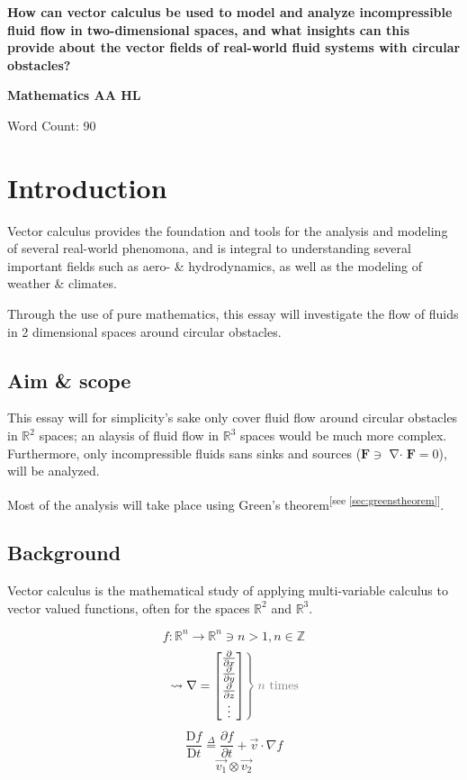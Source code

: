\documentclass[a4paper, 12pt]{article} %
\newcommand{\researchquestion}{How can vector calculus be used to model and analyze incompressible fluid flow in two-dimensional spaces, and what insights can this provide about the vector fields of real-world fluid systems with circular obstacles?}
\newcommand{\fatf}{\mathbf{F}} %
\newcommand{\definedas}{\stackrel{\Delta}{=}} %
\newcommand{\referto}[1]{\textsuperscript{\color{darkgray}\tiny[see \ref{#1}]}} %
\newcommand{\partialder}[2]{\frac{\partial #1}{\partial #2}} %
\newcommand{\materialder}[2]{\frac{\mathrm{D} #1}{\mathrm{D} #2}} %
\DeclareMathOperator{\divergence}{\nabla\cdot} %
\begin{document}
\begin{titlepage} %
	\begin{center}
		\vspace*{0.5cm}
		\Large
		\textbf{\researchquestion}

		\vspace{1.5cm}
		\large
		\textbf{Mathematics AA HL}

		\vfill{}\color{darkgray}
		Word Count: 90 %
	\end{center}
\end{titlepage}

\tableofcontents\newpage %

\section{Introduction}
Vector calculus provides the foundation and tools for the analysis and modeling of several real-world phenomona, and is integral to understanding several important fields such as aero- \& hydrodynamics, as well as the modeling of weather \& climates. 

Through the use of pure mathematics, this essay will investigate the flow of fluids in 2 dimensional spaces around circular obstacles.
\subsection{Aim \& scope}
This essay will for simplicity's sake only cover fluid flow around circular obstacles in $\mathbb{R}^2$ spaces; an alaysis of fluid flow in $\mathbb{R}^3$ spaces would be much more complex.
Furthermore, only incompressible fluids sans sinks and sources ($\fatf\ni\divergence\fatf=0$), will be analyzed.

Most of the analysis will take place using Green's theorem\referto{sec:greenstheorem}.

\subsection{Background}
Vector calculus is the mathematical study of applying multi-variable calculus to vector valued functions, often for the spaces $\mathbb{R}^2$ and $\mathbb{R}^3$.

$$f:\mathbb{R}^n\rightarrow\mathbb{R}^n\ni n>1,n\in\mathbb{Z}$$
\begin{equation}
	\left.\leadsto\nabla=
	\left[\begin{matrix}
		\partialder{}{x} \\
		\partialder{}{y} \\
		\partialder{}{z} \\ 
		\vdots 	         \\
	\end{matrix}\right]
	\color{gray}\right\} \color{gray}n\text{ times}\color{black}
\end{equation}
\begin{equation}
	\materialder{f}{t}\definedas\partialder{f}{t}+\vec{v}\cdot\nabla f
\end{equation}
$$\vec{v_1}\otimes\vec{v_2}$$
\end{document}

